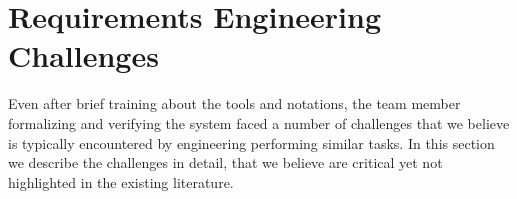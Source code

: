 \section{Requirements Engineering Challenges}
\label{sec:challenge}


Even after brief training about the tools and notations, the team member formalizing and verifying the system faced a number of challenges that we believe is typically encountered by engineering performing similar tasks. In this section we describe the challenges in detail, that we believe are critical yet not highlighted in the existing literature.
